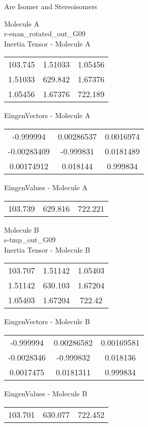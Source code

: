 \begin{center}
\vtab
\vtab
\textcolor{NavyBlue}{\Large Are Isomer and Stereoisomers}
\end{center}
\newpage
\begin{multicols}{2}
\begin{center}
Molecule A \\ 
r-enan\_rotated\_out\_G09
\\
Inertia Tensor - Molecule A \\
\vtab
\begin{tabular}{|c c c|}
103.745	 & 	1.51033	 & 	1.05456	 \\
1.51033	 & 	629.842	 & 	1.67376	 \\
1.05456	 & 	1.67376	 & 	722.189
\end{tabular}

\vtab
 EingenVectors - Molecule A     \\
\vtab
\begin{tabular}{|c c c|}
-0.999994	 & 	0.00286537	 & 	0.0016974	 \\
-0.00283409	 & 	-0.999831	 & 	0.0181489	 \\
0.00174912	 & 	0.018144	 & 	0.999834
\end{tabular}

\vtab
 EingenValues - Molecule A     \\
\vtab
\begin{tabular}{|c c c|}
103.739	 & 	629.816	 & 	722.221
\end{tabular}
\columnbreak

Molecule B \\ 
s-tmp\_out\_G09
\\
Inertia Tensor - Molecule B \\
\vtab
\begin{tabular}{|c c c|}
103.707	 & 	1.51142	 & 	1.05403	 \\
1.51142	 & 	630.103	 & 	1.67204	 \\
1.05403	 & 	1.67204	 & 	722.42
\end{tabular}

\vtab
 EingenVectors - Molecule B     \\
\vtab
\begin{tabular}{|c c c|}
-0.999994	 & 	0.00286582	 & 	0.00169581	 \\
-0.0028346	 & 	-0.999832	 & 	0.018136	 \\
0.0017475	 & 	0.0181311	 & 	0.999834
\end{tabular}

\vtab
 EingenValues - Molecule B     \\
\vtab
\begin{tabular}{|c c c|}
103.701	 & 	630.077	 & 	722.452
\end{tabular}

\end{center}
\end{multicols}
